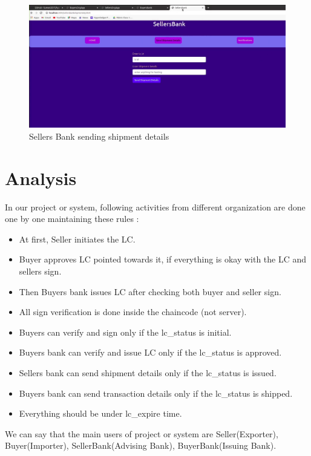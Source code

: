 \documentclass[a4paper,12pt]{report}
\begin{document}
\begin{figure}[b]
    \includegraphics[width=0.7\paperwidth]{8.pdf}
    \caption{Sellers Bank sending shipment details}
    \label{fig:8}
\end{figure}


\chapter{Analysis}

In our project or system, following activities from different organization are done one by one maintaining these rules :
\begin{itemize}
\item At first, Seller initiates the LC.
\item Buyer approves LC pointed towards it, if everything is okay with the LC and sellers sign.
\item Then Buyers bank issues LC after checking both buyer and seller sign.
\item All sign verification is done inside the chaincode (not server).
\item Buyers can verify and sign only if the lc\_status is initial.
\item Buyers bank can verify and issue LC only if the lc\_status is approved.
\item Sellers bank can send shipment details only if the lc\_status is issued.
\item Buyers bank can send transaction details only if the lc\_status is shipped.
\item Everything should be under lc\_expire time.
\end{itemize}

We can say that the main users of project or system are Seller(Exporter), Buyer(Importer), SellerBank(Advising Bank), BuyerBank(Issuing Bank).
\end{document}
